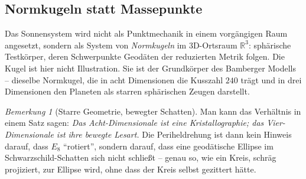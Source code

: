 \documentclass[11pt,a4paper]{article}
\theoremstyle{definition}
\theoremstyle{remark}
\newtheorem{bemerkung}{Bemerkung}[section]
\newcommand{\so}{\mathfrak{so}}
\begin{document}
\subsection{Normkugeln statt Massepunkte}

Das Sonnensystem wird nicht als Punktmechanik in einem vorgängigen Raum angesetzt, sondern als System von \emph{Normkugeln} im 3D-Ortsraum \(\mathbb{R}^3\): sphärische Testkörper, deren Schwerpunkte Geodäten der reduzierten Metrik folgen. Die Kugel ist hier nicht Illustration. Sie ist der Grundkörper des Bamberger Modells -- dieselbe Normkugel, die in acht Dimensionen die Kusszahl \(240\) trägt und in drei Dimensionen den Planeten als starren sphärischen Zeugen darstellt.

\begin{bemerkung}[Starre Geometrie, bewegter Schatten]
Man kann das Verhältnis in einem Satz sagen: \emph{Das Acht-Dimensionale ist eine Kristallographie; das Vier-Dimensionale ist ihre bewegte Lesart.} Die Periheldrehung ist dann kein Hinweis darauf, dass \(E_8\) \enquote{rotiert}, sondern darauf, dass eine geodätische Ellipse im Schwarzschild-Schatten sich nicht schließt -- genau so, wie ein Kreis, schräg projiziert, zur Ellipse wird, ohne dass der Kreis selbst gezittert hätte.
\end{bemerkung}

\vspace{0.6em}
\begin{center}
\end{center}
\vspace{0.4em}
\end{document}
